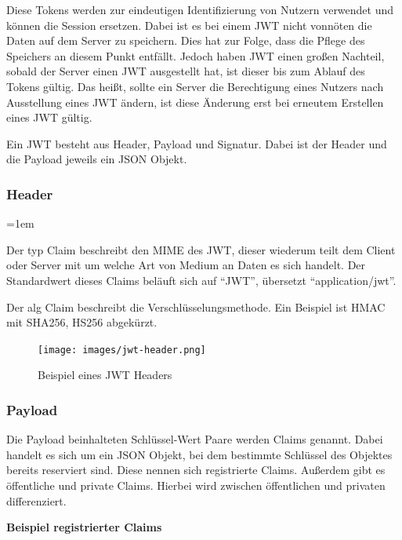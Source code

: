 \documentclass[11pt]{article}
\begin{document}
	Diese Tokens werden zur eindeutigen Identifizierung von Nutzern verwendet und können die Session ersetzen. Dabei ist es bei einem \gls{JWT} nicht vonnöten die Daten auf dem Server zu speichern. Dies hat zur Folge, dass die Pflege des Speichers an diesem Punkt entfällt. Jedoch haben \gls{JWT} einen großen Nachteil, sobald der Server einen \gls{JWT} ausgestellt hat, ist dieser bis zum Ablauf des Tokens gültig. Das heißt, sollte ein Server die Berechtigung eines Nutzers nach Ausstellung eines \gls{JWT} ändern, ist diese Änderung erst bei erneutem Erstellen eines \gls{JWT} gültig.
	
	Ein \gls{JWT} besteht aus Header, Payload und Signatur. Dabei ist der Header und die Payload jeweils ein \gls{JSON} Objekt.
	
	\subsubsection{Header}
	\label{sec: jwt_header}
	
	\begin{description}
		\leftskip=1em
		\item[typ] Der typ Claim beschreibt den \gls{MIME} des \gls{JWT}, dieser wiederum teilt dem Client oder Server mit um welche Art von Medium an Daten es sich handelt. Der Standardwert dieses Claims beläuft sich auf \enquote{JWT}, übersetzt \enquote{application/jwt}.
		\item[alg] Der alg Claim beschreibt die Verschlüsselungsmethode. Ein Beispiel ist \gls{HMAC} mit \gls{SHA256}, HS256 abgekürzt.
	\end{description}
	
	\begin{figure}[h]
		\texttt{[image: images/jwt-header.png]}
		\caption{Beispiel eines \gls{JWT} Headers }
		\label{fig:jwt-header}
	\end{figure}
	
	\subsubsection{Payload}
	\label{sec: jwt-payload}
	
	Die Payload beinhalteten Schlüssel-Wert Paare werden Claims genannt. Dabei handelt es sich um ein JSON Objekt, bei dem bestimmte Schlüssel des Objektes bereits reserviert sind. Diese nennen sich registrierte Claims. Außerdem gibt es öffentliche und private Claims. Hierbei wird zwischen öffentlichen und privaten differenziert.
		
	\noindent
	\textbf{Beispiel registrierter Claims}
	
\end{document}
